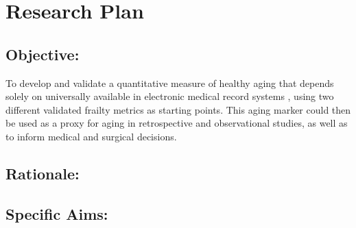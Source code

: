 \section{Research Plan }\label{research-plan}


\subsection{Objective:}\label{objective}
  
To develop and validate a quantitative measure of healthy aging that depends solely on universally available in electronic medical record systems ,
using two different validated frailty metrics as starting points. This
aging marker could then be used as a proxy for aging in retrospective
and observational studies, as well as to inform medical and surgical
decisions.


\subsection{Rationale:}\label{rationale}

\subsection{Specific Aims:}\label{specific-aims}
